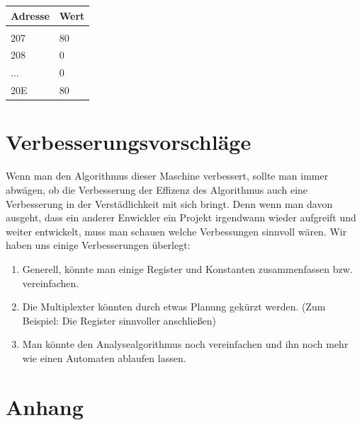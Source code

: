 \documentclass[12pt,titlepage]{article}
\begin{document}
\begin{table}[h!]
    \begin{tabular}{l|l}
    Adresse & Wert            \\
    \hline                    \\
    207   & 80       \\
    208   & 0        \\
    ...   & 0        \\
    20E   & 80       \\
    \end{tabular}
\end{table}

\newpage

\section{Verbesserungsvorschläge} 
Wenn man den Algorithmus dieser Maschine verbessert, sollte man immer abw{\"a}gen, ob die Verbesserung der Effizenz des Algorithmus auch eine Verbesserung in der Verst{\"a}dlichkeit mit sich bringt. Denn wenn man davon ausgeht, dass ein anderer Enwickler ein Projekt irgendwann wieder aufgreift und weiter entwickelt, muss man schauen welche Verbessungen sinnvoll w{\"a}ren. 
Wir haben uns einige Verbesserungen überlegt: 
\begin{enumerate} 
\item Generell, könnte man einige Register und Konstanten zusammenfassen bzw. vereinfachen.
\item Die Multiplexter könnten durch etwas Planung gekürzt werden. (Zum Beispiel: Die Register sinnvoller anschließen)
\item Man könnte den Analysealgorithmus noch vereinfachen und ihn noch mehr wie einen Automaten ablaufen lassen.
\end{enumerate}

\section{Anhang}
\end{document}
